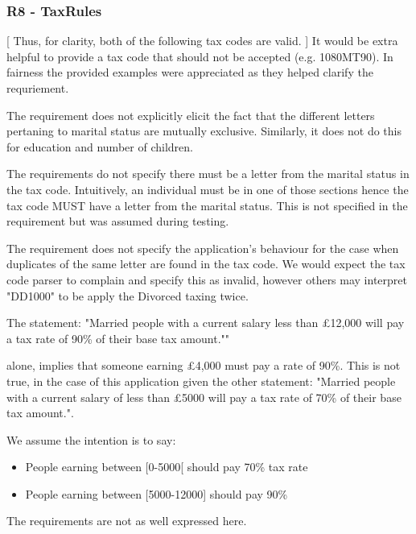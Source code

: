 \subsubsection{R8 - TaxRules}
[ Thus, for clarity, both of the following tax codes are valid. ] 
It would be extra helpful to provide a tax code that should not be accepted (e.g. 1080MT90). In fairness the provided examples were appreciated as they helped clarify the requriement.

The requirement does not explicitly elicit the fact that the different letters pertaning to marital status are mutually exclusive. Similarly, it does not do this for education and number of children. 

The requirements do not specify there must be a letter from the marital status in the tax code. Intuitively, an individual must be in one of those sections hence the tax code MUST have a letter from the marital status. This is not specified in the requirement but was assumed during testing. 

The requirement does not specify the application's behaviour for the case when duplicates of the same letter are found in the tax code. We would expect the tax code parser to complain and specify this as invalid, however others may interpret "DD1000" to be apply the Divorced taxing twice. 


The statement: "Married people with a current salary less than £12,000 will pay a tax rate of 90\% of their base tax amount.""

alone, implies that someone earning £4,000 must pay a rate of 90\%. This is not true, in the case of this application given the other statement: "Married people with a current salary of less than £5000 will pay a tax rate of 70\% of their base tax amount.". 

We assume the intention is to say: 

\begin{itemize}
	\item People earning between [0-5000[ should pay 70\% tax rate 
	\item People earning between [5000-12000] should pay 90\%
\end{itemize}

The requirements are not as well expressed here. 

